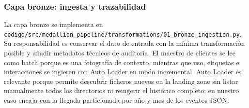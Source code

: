 \documentclass[12pt,a4paper]{article}
\begin{document}
\subsubsection{Capa bronze: ingesta y trazabilidad}

La capa bronze se implementa en \nolinkurl{codigo/src/medallion_pipeline/transformations/01_bronze_ingestion.py}. Su responsabilidad es conservar el dato de entrada con la mínima transformación posible y añadir metadatos técnicos de auditoría. El maestro de clientes se lee como batch porque es una fotografía de contexto, mientras que uso, etiquetas e interacciones se ingieren con Auto Loader en modo incremental. Auto Loader es relevante porque permite descubrir ficheros nuevos en la landing zone sin listar manualmente todos los directorios ni reingerir el histórico completo; en nuestro caso encaja con la llegada particionada por año y mes de los eventos JSON.\par
\end{document}
